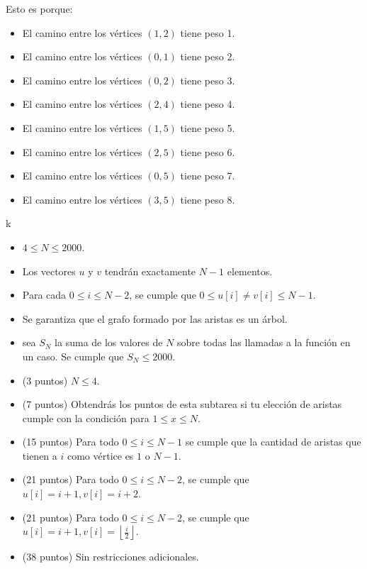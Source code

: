 \documentclass[12pt]{scrartcl}
\begin{document}
\begin{itemize}
\begin{center}
            \end{center}
            Esto es porque:
            \begin{itemize}
                \item El camino entre los vértices $(1, 2)$ tiene peso 1.
                \item El camino entre los vértices $(0, 1)$ tiene peso 2.
                \item El camino entre los vértices $(0, 2)$ tiene peso 3.
                \item El camino entre los vértices $(2, 4)$ tiene peso 4.
                \item El camino entre los vértices $(1, 5)$ tiene peso 5.
                \item El camino entre los vértices $(2, 5)$ tiene peso 6.
                \item El camino entre los vértices $(0, 5)$ tiene peso 7.
                \item El camino entre los vértices $(3, 5)$ tiene peso 8.
            \end{itemize}
        \end{itemize}
        k

        \begin{itemize}
            \item $4 \le N \le 2000$.
            \item Los vectores $u$ y $v$ tendrán exactamente $N - 1$ elementos.
            \item Para cada $0 \le i \le N - 2$, se cumple que $0 \le u[i] \neq v[i] \le N - 1$. 
            \item Se garantiza que el grafo formado por las aristas es un árbol.
            \item sea $S_N$ la suma de los valores de $N$ sobre todas las llamadas a la función en un caso. Se cumple que $S_N \le 2000$.
        \end{itemize}
    


    \begin{itemize}
        \item (3 puntos) $N \le 4$.
        \item (7 puntos) Obtendrás los puntos de esta subtarea si tu elección de aristas cumple con la condición para $1 \le x \le N$.
        \item (15 puntos) Para todo $0 \le i \le N - 1$  se cumple que la cantidad de aristas que tienen a $i$ como vértice es $1$ o $N - 1$.
        \item (21 puntos) Para todo $0 \le i \le N - 2$, se cumple que $u[i] = i + 1, v[i] = i + 2$.
        \item (21 puntos) Para todo $0 \le i \le N - 2$, se cumple que $u[i] = i + 1, v[i] = \left\lfloor\frac{i}{2} \right\rfloor$.
        \item (38 puntos) Sin restricciones adicionales.
    \end{itemize}
\end{document}
